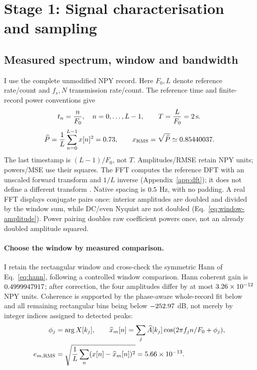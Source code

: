 \FloatBarrier
\section{Stage 1: Signal characterisation and sampling}
\subsection{Measured spectrum, window and bandwidth}
\label{sec:r11}
I use the complete unmodified NPY record. Here $ F_0,L $ denote reference
rate/count and $ f_s,N $ transmission rate/count. The reference time and
finite-record power conventions give 
\begin{equation}
 t_n=\frac{n}{F_0},\quad n=0,\ldots,L-1,\qquad
 T=\frac L{F_0}=2\,\mathrm{s}.
 \label{eq:time-grid}
\end{equation}
\begin{equation}
 \widehat P=\frac1L\sum_{n=0}^{L-1}x[n]^2=0.73,
 \qquad x_{\mathrm{RMS}}=\sqrt{\widehat P}\simeq0.85440037.
 \label{eq:finite-power}
\end{equation}
The last timestamp is $(L-1)/F_0 $, not $ T $. Amplitudes/RMSE retain NPY
units; powers/MSE use their squares. The FFT computes the reference DFT
with an unscaled forward transform and $1/L $ inverse
(Appendix~\ref{app:dft}); it does not define a different transform
 \citep{cooley1965fft}.
Native spacing is $0.5 $ Hz, with no padding. A real FFT displays
conjugate pairs once: interior amplitudes are doubled and divided by
the window sum, while DC/even Nyquist are not doubled
(Eq.~\eqref{eq:window-amplitude}). Power pairing doubles raw coefficient
powers once, not an already doubled amplitude squared.

\paragraph{Choose the window by measured comparison.}
I retain the rectangular window and cross-check the symmetric Hann
of Eq.~\eqref{eq:hann}, following a controlled window comparison. Hann coherent gain is $0.4999947917 $; after correction,
the four amplitudes differ by at most $3.26\times10^{-12} $ NPY units.
Coherence is supported by the phase-aware whole-record fit below and
all remaining rectangular bins being below $-252.97 $ dB, not merely
by integer indices assigned to detected peaks:
\begin{equation}
 \begin{aligned}
 \phi_j&=\arg X[k_j],\qquad
 \widehat x_m[n]=\sum_j\widehat A[k_j]\cos(2\pi f_jn/F_0+\phi_j),\\
 e_{m,\mathrm{RMS}}&=\sqrt{\frac1L\sum_n(x[n]-\widehat x_m[n])^2}
 =5.66\times10^{-13}.
 \end{aligned}
 \label{eq:component-model}
\end{equation}


